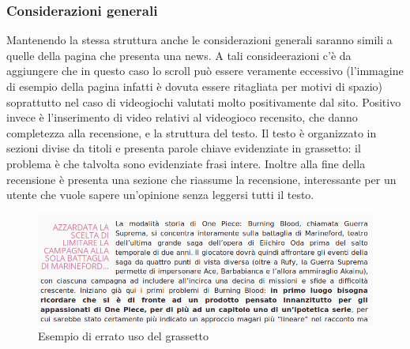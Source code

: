 \documentclass[../ProgettoTecWeb2.tex]{subfiles}
\begin{document}
		\subsubsection{Considerazioni generali}
		Mantenendo la stessa struttura anche le considerazioni generali saranno simili a quelle della pagina che presenta una news. A tali consideerazioni c'è da aggiungere che in questo caso lo scroll può essere veramente eccessivo (l'immagine di esempio della pagina infatti è dovuta essere ritagliata per motivi di spazio) soprattutto nel caso di videogiochi valutati molto positivamente dal sito. Positivo invece è l'inserimento di video relativi al videogioco recensito, che danno completezza alla recensione, e la struttura del testo. Il testo è organizzato in sezioni divise da titoli e presenta parole chiave evidenziate in grassetto: il problema è che talvolta sono evidenziate frasi intere. Inoltre alla fine della recensione è presenta una sezione che riassume la recensione, interessante per un utente che vuole sapere un'opinione senza leggersi tutti il testo.
		\begin{figure} [H]
			\centering
			\includegraphics[scale=0.4]{img/ErratoUsoGrassetto}
			\caption{Esempio di errato uso del grassetto}
		\end{figure}

	\newpage
\end{document}
